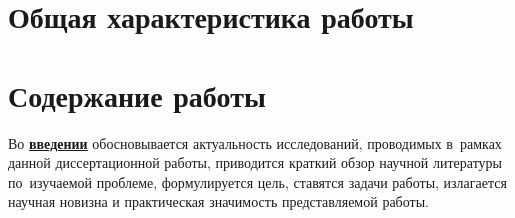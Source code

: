 \section*{Общая характеристика работы}

\newcommand{\actuality}{\pdfbookmark[1]{Актуальность темы исследования}{actuality}\underline{\textbf{\actualityTXT}}}

\newcommand{\progress}{\pdfbookmark[1]{Степень разработанности темы исследования}{progress}\underline{\textbf{\progressTXT}}}

\newcommand{\aim}{\pdfbookmark[1]{Цели}{aim}\underline{{\textbf\aimTXT}}}
\newcommand{\tasks}{\pdfbookmark[1]{Задачи}{tasks}\underline{\textbf{\tasksTXT}}}
\newcommand{\aimtasks}{\pdfbookmark[1]{Цели и задачи}{aimtasks}\aimtasksTXT}
\newcommand{\novelty}{\pdfbookmark[1]{Научная новизна}{novelty}\underline{\textbf{\noveltyTXT}}}
\newcommand{\influence}{\pdfbookmark[1]{Теоретическая и практическая значимость работы}{influence}\underline{\textbf{\influenceTXT}}}
\newcommand{\methods}{\pdfbookmark[1]{Методология и методы исследования}{methods}\underline{\textbf{\methodsTXT}}}
\newcommand{\defpositions}{\pdfbookmark[1]{Положения, выносимые на защиту}{defpositions}\underline{\textbf{\defpositionsTXT}}}
\newcommand{\reliability}{\pdfbookmark[1]{Достоверность}{reliability}\underline{\textbf{\reliabilityTXT}}}
\newcommand{\contribution}{\pdfbookmark[1]{Личный вклад}{contribution}\underline{\textbf{\contributionTXT}}}
\newcommand{\publications}{\pdfbookmark[1]{Публикации}{publications}\underline{\textbf{\publicationsTXT}}}




\section*{Содержание работы}
Во \underline{\textbf{введении}} обосновывается актуальность
исследований, проводимых в~рамках данной диссертационной работы,
приводится краткий обзор научной литературы по~изучаемой проблеме,
формулируется цель, ставятся задачи работы, излагается научная новизна
и практическая значимость представляемой работы.


